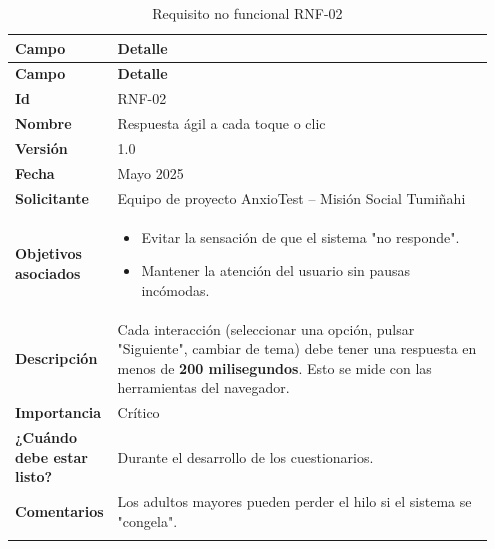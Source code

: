 \begin{longtable}{p{0.15\linewidth} p{0.80\linewidth}}
\toprule
\rowcolor{tableheader!20}
\textbf{Campo} & \textbf{Detalle} \\
\midrule
\endfirsthead
\rowcolor{tableheader!20}
\textbf{Campo} & \textbf{Detalle} \\
\midrule
\endhead
\bottomrule
\endfoot
\textbf{Id} & RNF-02 \\
\textbf{Nombre} & Respuesta ágil a cada toque o clic \\
\textbf{Versión} & 1.0 \\
\textbf{Fecha} & Mayo 2025 \\
\textbf{Solicitante} & Equipo de proyecto AnxioTest – Misión Social Tumiñahi \\
\textbf{Objetivos asociados} & 
  \begin{itemize}
    \item Evitar la sensación de que el sistema "no responde".
    \item Mantener la atención del usuario sin pausas incómodas.
  \end{itemize} \\
\textbf{Descripción} & Cada interacción (seleccionar una opción, pulsar "Siguiente", cambiar de tema) debe tener una respuesta en menos de \textbf{200 milisegundos}. Esto se mide con las herramientas del navegador. \\
\textbf{Importancia} & Crítico \\
\textbf{¿Cuándo debe estar listo?} & Durante el desarrollo de los cuestionarios. \\
\textbf{Comentarios} & Los adultos mayores pueden perder el hilo si el sistema se "congela". \\
\bottomrule
\caption{Requisito no funcional RNF-02}
\end{longtable}

